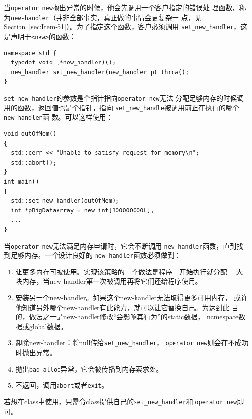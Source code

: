 当\texttt{operator new}抛出异常的时候，他会先调用一个客户指定的错误处
理函数，称为\texttt{new-handler}（并非全部事实，真正做的事情会更复杂一
点，见Section~\ref{sec:Item-51}）。为了指定这个函数，客户必须调用
\texttt{set\_new\_handler}，这是声明于\texttt{<new>}的函数：
\begin{verbatim}
namespace std {
  typedef void (*new_handler)();
  new_handler set_new_handler(new_handler p) throw();
}
\end{verbatim}

\texttt{set\_new\_handler}的参数是个指针指向\texttt{operator new}无法
分配足够内存的时候调用的函数，返回值也是个指针，指向
\texttt{set\_new\_handle}被调用前正在执行的哪个\texttt{new-handler}函
数。可以这样使用：

\begin{verbatim}
void outOfMem()
{
  std::cerr << "Unable to satisfy request for memory\n";
  std::abort();
}
int main()
{
  std::set_new_handler(outOfMem);
  int *pBigDataArray = new int[100000000L];
  ...
}
\end{verbatim}

当\texttt{operator new}无法满足内存申请时，它会不断调用
\texttt{new-handler}函数，直到找到足够内存。一个设计良好的
\texttt{new-handler}函数必须做到：
\begin{enumerate}
\item 让更多内存可被使用。实现该策略的一个做法是程序一开始执行就分配一
  大块内存，当new-handler第一次被调用再将它们还给程序使用。
\item 安装另一个new-handler。如果这个new-handler无法取得更多可用内存，
  或许他知道另外哪个new-handler有此能力，就可以让它替换自己。为达到此
  目的，做法之一是new-handler修改“会影响其行为”的static数据，
  namespace数据或global数据。
\item 卸除new-handler：将null传给\texttt{set\_new\_handler}，
  \texttt{operator new}则会在不成功时抛出异常。
\item 抛出\texttt{bad\_alloc}异常，它会被传播到内存索求处。
\item 不返回，调用\texttt{abort}或者\texttt{exit}。
\end{enumerate}

若想在class中使用，只需令class提供自己的\texttt{set\_new\_handler}和
\texttt{operator new}即可。

